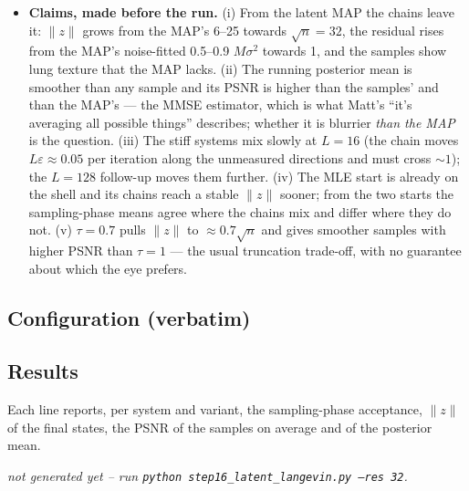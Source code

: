 \documentclass[11pt]{article}
\begin{document}
\begin{itemize}
        the distance moved from the initialisation and the spread of the
        chains. The videos show, per system, the three chains of each
        variant, the running posterior mean (sampling phase) with its PSNR,
        and the running std, one frame per iteration.
  \item \textbf{Claims, made before the run.} (i) From the latent MAP the
        chains leave it: $\|z\|$ grows from the MAP's 6--25 towards
        $\sqrt n = 32$, the residual rises from the MAP's noise-fitted
        0.5--0.9 $M\sigma^2$ towards 1, and the samples show lung texture
        that the MAP lacks. (ii) The running posterior mean is smoother
        than any sample and its PSNR is higher than the samples' and than
        the MAP's --- the MMSE estimator, which is what Matt's ``it's
        averaging all possible things'' describes; whether it is blurrier
        \emph{than the MAP} is the question. (iii) The stiff systems mix
        slowly at $L = 16$ (the chain moves $L\varepsilon \approx 0.05$ per
        iteration along the unmeasured directions and must cross $\sim 1$);
        the $L = 128$ follow-up moves them further. (iv) The MLE start is
        already on the shell and its chains reach a stable $\|z\|$ sooner;
        from the two starts the sampling-phase means agree where the chains
        mix and differ where they do not. (v) $\tau = 0.7$ pulls $\|z\|$
        to $\approx 0.7\sqrt n$ and gives smoother samples with higher PSNR
        than $\tau = 1$ --- the usual truncation trade-off, with no
        guarantee about which the eye prefers.
\end{itemize}

\subsection{Configuration (verbatim)}
{\small}
{\small}
{\small}
{\small}

\subsection{Results}
Each line reports, per system and variant, the sampling-phase acceptance,
$\|z\|$ of the final states, the PSNR of the samples on average and of the
posterior mean.

  {\emph{not generated yet -- run \texttt{python step16\_latent\_langevin.py --res 32}.}}
\end{document}

